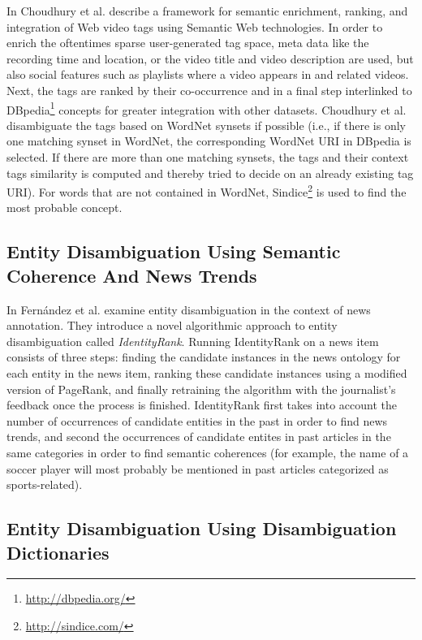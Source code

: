 \documentclass[twocolumn]{article}
\begin{document}
In \cite{Choudhury:YouTube} Choudhury et al. describe a framework for semantic enrichment, ranking, and integration of
Web video tags using Semantic Web technologies. In order to enrich the oftentimes sparse user-generated tag space, meta
data like the recording time and location, or the video title and video description are used, but also social features
such as playlists where a video appears in and related videos. Next, the tags are ranked by their co-occurrence and in
a final step interlinked to DBpedia\footnote{\url{http://dbpedia.org/}} concepts for greater integration with other
datasets. Choudhury et al. disambiguate the tags based on WordNet\cite{Princeton:WordNet} synsets if possible (i.e., if
there is only one matching synset in WordNet, the corresponding WordNet URI in DBpedia is selected. If there are more
than one matching synsets, the tags and their context tags similarity is computed and thereby tried to decide on an
already existing tag URI). For words that are not contained in WordNet, Sindice\footnote{\url{http://sindice.com/}} is
used to find the most probable concept.

\subsection{Entity Disambiguation Using Semantic Coherence And News Trends}

In \cite{Fernandez:IdentityRank} Fern\'{a}ndez et al. examine entity disambiguation in the context of news annotation.
They introduce a novel algorithmic approach to entity disambiguation called \textit{IdentityRank}. Running IdentityRank
on a news item consists of three steps: finding the candidate instances in the news ontology for each entity in the
news item, ranking these candidate instances using a modified version of PageRank\cite{Brin:PageRank}, and finally
retraining the algorithm with the journalist's feedback once the process is finished. IdentityRank first takes into
account the number of occurrences of candidate entities in the past in order to find news trends, and second the
occurrences of candidate entites in past articles in the same categories in order to find semantic coherences (for
example, the name of a soccer player will most probably be mentioned in past articles categorized as sports-related).

\subsection{Entity Disambiguation Using Disambiguation Dictionaries}
\end{document}
